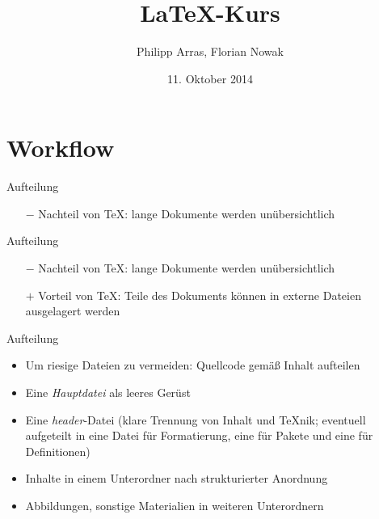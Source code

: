 \documentclass[11pt]{beamer}
\author{Philipp Arras, Florian Nowak}
\title{\LaTeX -Kurs}
\date{11. Oktober 2014}
\begin{document}


\section{Workflow}

\begin{frame}{Aufteilung}
\begin{itemize}
\item[$-$] Nachteil von {\TeX}: lange Dokumente werden unübersichtlich
\end{itemize}
\end{frame}

\begin{frame}{Aufteilung}
\begin{itemize}
\item[$-$] Nachteil von {\TeX}: lange Dokumente werden unübersichtlich
\item[$+$] Vorteil von {\TeX}: Teile des Dokuments können in externe Dateien ausgelagert werden
\end{itemize}
\end{frame}

\begin{frame}{Aufteilung}
\begin{itemize}
\item Um riesige Dateien zu vermeiden: Quellcode gemäß Inhalt aufteilen
\item Eine \emph{Hauptdatei} als leeres Gerüst
\item Eine \emph{header}-Datei (klare Trennung von Inhalt und {\TeX}nik; eventuell aufgeteilt in eine Datei für Formatierung, eine für Pakete und eine für Definitionen)
\item Inhalte in einem Unterordner nach strukturierter Anordnung
\item Abbildungen, sonstige Materialien in weiteren Unterordnern
\end{itemize}
\end{frame}
\end{document}
